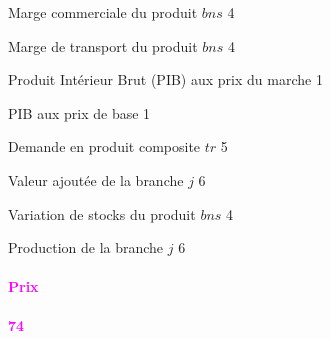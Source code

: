 \documentclass[11pt,a4paper]{article}
\newcommand{\bns}{\mathit{bns}}
\newcommand{\MRGTRP}{\mathit{MRGTRP}}
\newcommand{\MRGCOM}{\mathit{MRGCOM}}
\newcommand{\tr}{\mathit{tr}}
\newcommand{\VA}{\mathit{VA}}
\newcommand{\VSTK}{\mathit{VSTK}}
\newcommand{\XS}{\mathit{XS}}
\newcommand{\redparagraph}[1]{\paragraph*{\large\textcolor{Fuchsia}{#1}}}
\newcommand{\PIB}{\mathit{PIB}}
\begin{document}
\begin{description}[leftmargin=!,labelwidth=\widthof{\bfseries AAAAAAAA},parsep=10pt]
		\item[$\MRGCOM_{\bns}$]	Marge commerciale du produit $\bns$ 	\hfill 4
		\item[$\MRGTRP_{\bns}$]	Marge de transport du produit $\bns$ 	\hfill 4
		\item[$\PIB^{\mathit{MP}_\mathit{reel}}$] Produit Intérieur Brut (PIB) aux prix du marche \hfill 1
		\item[$\PIB^{\mathit{BP}_\mathit{reel}}$] PIB aux prix de base 	\hfill 1
		\item[$Q_{\tr}$]		Demande en produit composite $\tr$ 		\hfill 5
		\item[$\VA_j$]			Valeur ajoutée de la branche $j$ 		\hfill 6
		\item[$\VSTK_{\bns}$]	Variation de stocks du produit $\bns$	\hfill 4
		\item[$\XS_j$]			Production de la branche $j$ 			\hfill 6
	\end{description}
	\redparagraph{Prix}\hfill \textcolor{Fuchsia}{\textbf{74}} 
\end{document}
